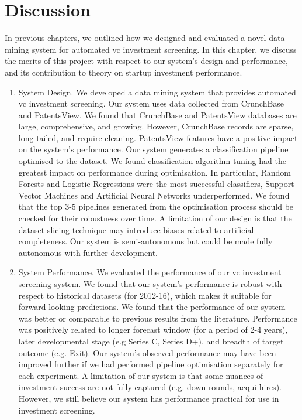 \documentclass[../thesis/thesis.tex]{subfiles}
\begin{document}
\chapter{Discussion}
\label{chap:discussion}

In previous chapters, we outlined how we designed and evaluated a novel data mining system for automated \gls{vc} investment screening. In this chapter, we discuss the merits of this project with respect to our system's design and performance, and its contribution to theory on startup investment performance.

\begin{enumerate}

\item System Design. We developed a data mining system that provides automated \gls{vc} investment screening. Our system uses data collected from CrunchBase and PatentsView. We found that CrunchBase and PatentsView databases are large, comprehensive, and growing. However, CrunchBase records are sparse, long-tailed, and require cleaning. PatentsView features have a positive impact on the system's performance. Our system generates a classification pipeline optimised to the dataset. We found classification algorithm tuning had the greatest impact on performance during optimisation. In particular, Random Forests and Logistic Regressions were the most successful classifiers, Support Vector Machines and Artificial Neural Networks underperformed. We found that the top 3-5 pipelines generated from the optimisation process should be checked for their robustness over time. A limitation of our design is that the dataset slicing technique may introduce biases related to artificial completeness. Our system is semi-autonomous but could be made fully autonomous with further development.

\item System Performance. We evaluated the performance of our \gls{vc} investment screening system. We found that our system's performance is robust with respect to historical datasets (for 2012-16), which makes it suitable for forward-looking predictions. We found that the performance of our system was better or comparable to previous results from the literature. Performance was positively related to longer forecast window (for a period of 2-4 years), later developmental stage (e.g Series C, Series D+), and breadth of target outcome (e.g. Exit). Our system's observed performance may have been improved further if we had performed pipeline optimisation separately for each experiment. A limitation of our system is that some nuances of investment success are not fully captured (e.g. down-rounds, acqui-hires). However, we still believe our system has performance practical for use in investment screening.


\end{enumerate}
\end{document}
